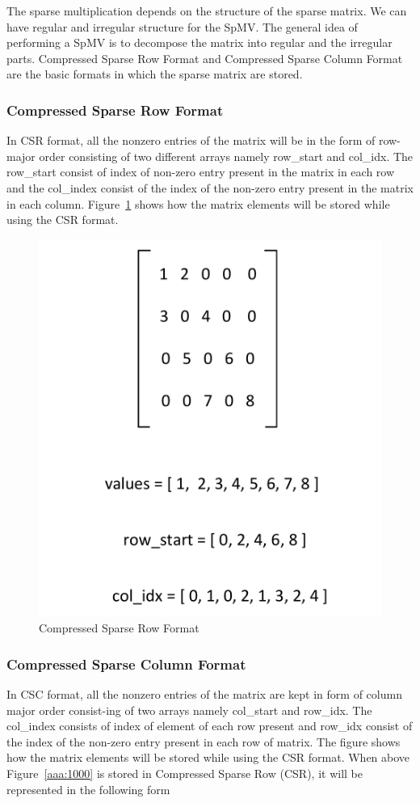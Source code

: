 The sparse multiplication depends on the structure of the sparse matrix. We can have regular and irregular structure for the SpMV. The general idea of performing a SpMV is to decompose the matrix into regular and the irregular parts. Compressed Sparse Row Format and Compressed Sparse Column Format are the basic formats in which the sparse matrix 
are stored.

\subsubsection{Compressed Sparse Row Format}

In CSR format, all the nonzero entries of the matrix will be in the form of row-major order consisting of two different arrays namely row\_start and col\_idx. The row\_start consist of index of non-zero entry present in the matrix in each row and the col\_index consist of the index of the non-zero entry present in the matrix in each column. Figure~\ref{aa:100} shows how the matrix elements will be stored while using the CSR format.

\begin{figure}
	\centering
	\includegraphics[width=.4\textwidth]{images/csr.pdf}
	\caption{Compressed Sparse Row Format}
	\label{aa:100}
\end{figure}

\subsubsection{Compressed Sparse Column Format}

In CSC format, all the nonzero entries of the matrix are kept in form of column major order consist-ing of two arrays namely col\_start and row\_idx. The col\_index consists of index of element of each row present and row\_idx consist of the index of the non-zero entry present in each row of matrix. The figure shows how the matrix elements will be stored while using the CSR format. When above Figure~\ref{aaa:1000} is stored in Compressed Sparse Row (CSR), it will be represented in the following form

